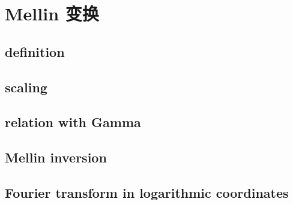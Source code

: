 \section{Mellin 变换}
\label{b3:sec:2105}


\subsection{definition}
\label{b3:subsec:210501}

\subsection{scaling}
\label{b3:subsec:210502}

\subsection{relation with Gamma}
\label{b3:subsec:210503}

\subsection{Mellin inversion}
\label{b3:subsec:210504}

\subsection{Fourier transform in logarithmic coordinates}
\label{b3:subsec:210505}


